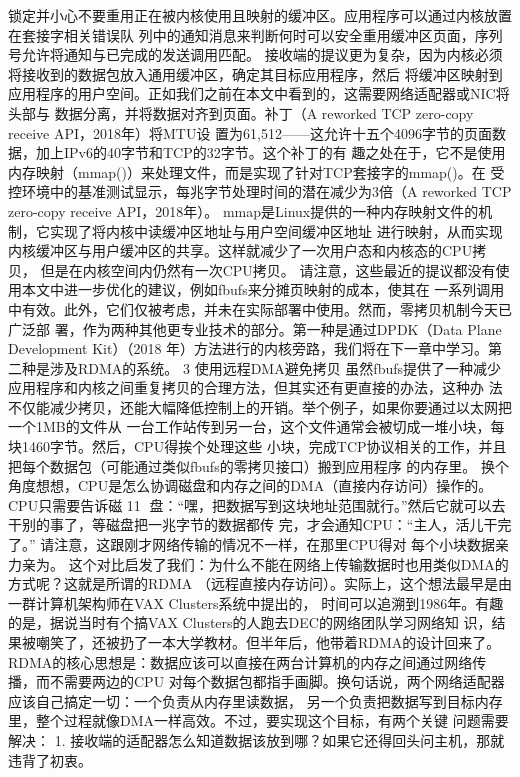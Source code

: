 锁定并小心不要重用正在被内核使用且映射的缓冲区。应用程序可以通过内核放置在套接字相关错误队
列中的通知消息来判断何时可以安全重用缓冲区页面，序列号允许将通知与已完成的发送调用匹配。
接收端的提议更为复杂，因为内核必须将接收到的数据包放入通用缓冲区，确定其目标应用程序，然后
将缓冲区映射到应用程序的用户空间。正如我们之前在本文中看到的，这需要网络适配器或NIC将头部与
数据分离，并将数据对齐到页面。补丁（A reworked TCP zero-copy receive API，2018年）将MTU设
置为61,512——这允许十五个4096字节的页面数据，加上IPv6的40字节和TCP的32字节。这个补丁的有
趣之处在于，它不是使用内存映射（mmap()）来处理文件，而是实现了针对TCP套接字的mmap()。在
受控环境中的基准测试显示，每兆字节处理时间的潜在减少为3倍（A reworked TCP zero-copy
receive API，2018年）。
mmap是Linux提供的一种内存映射文件的机制，它实现了将内核中读缓冲区地址与用户空间缓冲区地址
进行映射，从而实现内核缓冲区与用户缓冲区的共享。这样就减少了一次用户态和内核态的CPU拷贝，
但是在内核空间内仍然有一次CPU拷贝。
请注意，这些最近的提议都没有使用本文中进一步优化的建议，例如fbufs来分摊页映射的成本，使其在
一系列调用中有效。此外，它们仅被考虑，并未在实际部署中使用。然而，零拷贝机制今天已广泛部
署，作为两种其他更专业技术的部分。第一种是通过DPDK（Data Plane Development Kit）（2018
年）方法进行的内核旁路，我们将在下一章中学习。第二种是涉及RDMA的系统。
3 使用远程DMA避免拷贝
虽然fbufs提供了一种减少应用程序和内核之间重复拷贝的合理方法，但其实还有更直接的办法，这种办
法不仅能减少拷贝，还能大幅降低控制上的开销。举个例子，如果你要通过以太网把一个1MB的文件从
一台工作站传到另一台，这个文件通常会被切成一堆小块，每块1460字节。然后，CPU得挨个处理这些
小块，完成TCP协议相关的工作，并且把每个数据包（可能通过类似fbufs的零拷贝接口）搬到应用程序
的内存里。
换个角度想想，CPU是怎么协调磁盘和内存之间的DMA（直接内存访问）操作的。CPU只需要告诉磁
                                                                11
盘：“嘿，把数据写到这块地址范围就行。”然后它就可以去干别的事了，等磁盘把一兆字节的数据都传
完，才会通知CPU：“主人，活儿干完了。” 请注意，这跟刚才网络传输的情况不一样，在那里CPU得对
每个小块数据亲力亲为。
这个对比启发了我们：为什么不能在网络上传输数据时也用类似DMA的方式呢？这就是所谓的RDMA
（远程直接内存访问）。实际上，这个想法最早是由一群计算机架构师在VAX Clusters系统中提出的，
时间可以追溯到1986年。有趣的是，据说当时有个搞VAX Clusters的人跑去DEC的网络团队学习网络知
识，结果被嘲笑了，还被扔了一本大学教材。但半年后，他带着RDMA的设计回来了。
RDMA的核心思想是：数据应该可以直接在两台计算机的内存之间通过网络传播，而不需要两边的CPU
对每个数据包都指手画脚。换句话说，两个网络适配器应该自己搞定一切：一个负责从内存里读数据，
另一个负责把数据写到目标内存里，整个过程就像DMA一样高效。不过，要实现这个目标，有两个关键
问题需要解决：
 1. 接收端的适配器怎么知道数据该放到哪？如果它还得回头问主机，那就违背了初衷。

